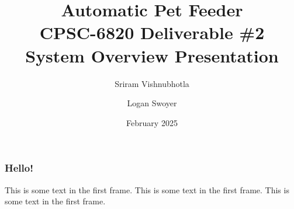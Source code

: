 \documentclass{beamer}
\title{Automatic Pet Feeder\\
\small CPSC-6820 Deliverable \#2\\
\large System Overview Presentation}
\author{Sriram Vishnubhotla \and Logan Swoyer}
\institute{Clemson University}
\date{February 2025}
\begin{document}
\frame{\titlepage}

\begin{frame}
    \frametitle{Hello!}
    This is some text in the first frame. This is some text in the first frame. This is some text in the first frame.
\end{frame}
\end{document}
